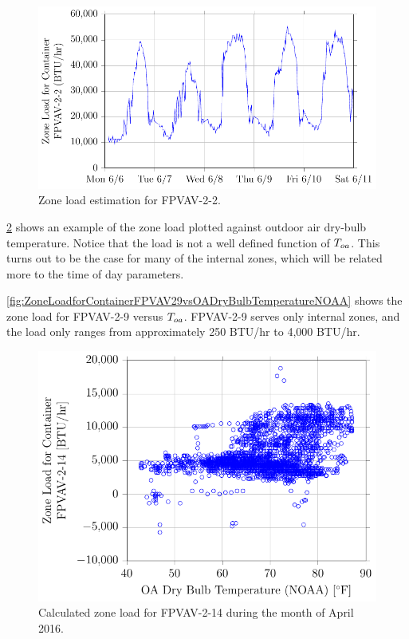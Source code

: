 \begin{figure}
\centering
\includegraphics[]{Plots/2016-06-22-1643-ZoneLoadforContainerFPVAV22-TikzData.pdf}
\caption{Zone load estimation for FPVAV-2-2.}
\label{fig:2016-06-22-1643-ZoneLoadforContainerFPVAV22-TikzData}
\end{figure}



\figref{} \ref{fig:ZoneLoadforContainerFPVAV214vsOADryBulbTemperatureNOAA} shows an example of the zone load plotted against outdoor air dry-bulb temperature. Notice that the load is not a well defined function of \(T_{oa}\). This turns out to be the case for many of the internal zones, which will be related more to the time of day parameters. 

\figref{} \ref{fig:ZoneLoadforContainerFPVAV29vsOADryBulbTemperatureNOAA} shows the zone load for FPVAV-2-9 versus \(T_{oa}\). FPVAV-2-9 serves only internal zones, and the load only ranges from approximately 250 BTU/hr to 4,000 BTU/hr.


\begin{figure}
\centering
\includegraphics[]{Plots/2016-06-22-1704-ZoneLoadforContainerFPVAV214vsOADryBulbTemperatureNOAA.pdf}
\caption{Calculated zone load for FPVAV-2-14 during the month of April 2016.}
\label{fig:ZoneLoadforContainerFPVAV214vsOADryBulbTemperatureNOAA}
\end{figure}


